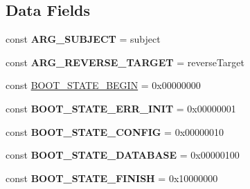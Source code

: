 \subsection*{Data Fields}
\begin{DoxyCompactItemize}
\item 
\hypertarget{interface_able_polecat___mode_interface_aa904785b93549a4198a238e73ba6ee52}{}const {\bfseries A\+R\+G\+\_\+\+S\+U\+B\+J\+E\+C\+T} = \textquotesingle{}subject\textquotesingle{}\label{interface_able_polecat___mode_interface_aa904785b93549a4198a238e73ba6ee52}

\item 
\hypertarget{interface_able_polecat___mode_interface_a1e9f1974c3fec162f5d258d5342497cc}{}const {\bfseries A\+R\+G\+\_\+\+R\+E\+V\+E\+R\+S\+E\+\_\+\+T\+A\+R\+G\+E\+T} = \textquotesingle{}reverse\+Target\textquotesingle{}\label{interface_able_polecat___mode_interface_a1e9f1974c3fec162f5d258d5342497cc}

\item 
const \hyperlink{interface_able_polecat___mode_interface_a9e73b7fe972bda025da142ee02fa2ef7}{B\+O\+O\+T\+\_\+\+S\+T\+A\+T\+E\+\_\+\+B\+E\+G\+I\+N} = 0x00000000
\item 
\hypertarget{interface_able_polecat___mode_interface_aeae07bbdc67e6b172c225d776218019f}{}const {\bfseries B\+O\+O\+T\+\_\+\+S\+T\+A\+T\+E\+\_\+\+E\+R\+R\+\_\+\+I\+N\+I\+T} = 0x00000001\label{interface_able_polecat___mode_interface_aeae07bbdc67e6b172c225d776218019f}

\item 
\hypertarget{interface_able_polecat___mode_interface_aa5ff5a145cf186d14bd72ef3fba9e1b4}{}const {\bfseries B\+O\+O\+T\+\_\+\+S\+T\+A\+T\+E\+\_\+\+C\+O\+N\+F\+I\+G} = 0x00000010\label{interface_able_polecat___mode_interface_aa5ff5a145cf186d14bd72ef3fba9e1b4}

\item 
\hypertarget{interface_able_polecat___mode_interface_ab38b53f0c7575e4ad58da4275c32981d}{}const {\bfseries B\+O\+O\+T\+\_\+\+S\+T\+A\+T\+E\+\_\+\+D\+A\+T\+A\+B\+A\+S\+E} = 0x00000100\label{interface_able_polecat___mode_interface_ab38b53f0c7575e4ad58da4275c32981d}

\item 
\hypertarget{interface_able_polecat___mode_interface_af99dec4b499493d5b70676873b00f136}{}const {\bfseries B\+O\+O\+T\+\_\+\+S\+T\+A\+T\+E\+\_\+\+F\+I\+N\+I\+S\+H} = 0x10000000\label{interface_able_polecat___mode_interface_af99dec4b499493d5b70676873b00f136}

\end{DoxyCompactItemize}
